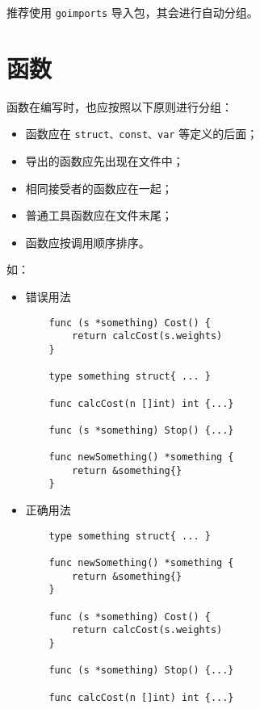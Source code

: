 推荐使用 \texttt{goimports} 导入包，其会进行自动分组。

\section{函数}
函数在编写时，也应按照以下原则进行分组：
\begin{itemize}[leftmargin=4em]
\item 函数应在 \texttt{struct、const、var} 等定义的后面；
\item 导出的函数应先出现在文件中；
\item 相同接受者的函数应在一起；
\item 普通工具函数应在文件末尾；
\item 函数应按调用顺序排序。
\end{itemize}

如：
\begin{itemize}[leftmargin=4em]
\item 错误用法

  \begin{verbatim}
    func (s *something) Cost() {
    	return calcCost(s.weights)
    }

    type something struct{ ... }

    func calcCost(n []int) int {...}

    func (s *something) Stop() {...}

    func newSomething() *something {
    	return &something{}
    }
  \end{verbatim}
\item 正确用法

  \begin{verbatim}
    type something struct{ ... }

    func newSomething() *something {
    	return &something{}
    }

    func (s *something) Cost() {
    	return calcCost(s.weights)
    }

    func (s *something) Stop() {...}

    func calcCost(n []int) int {...}
  \end{verbatim}
\end{itemize}

